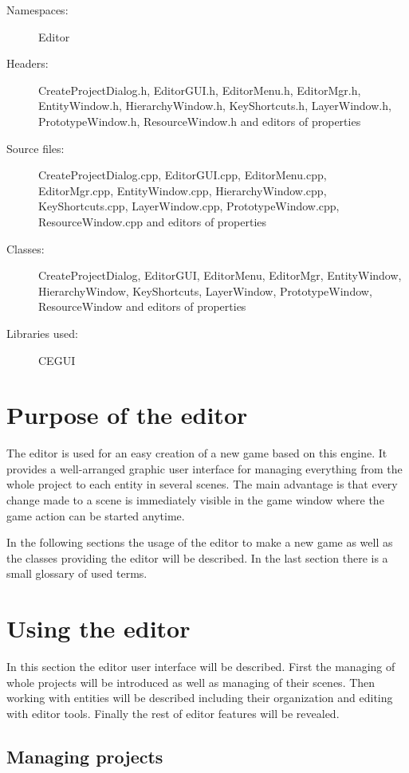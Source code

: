 \begin{description}
  \item[Namespaces:] Editor
  \item[Headers:] CreateProjectDialog.h, EditorGUI.h, EditorMenu.h, EditorMgr\-.h, EntityWindow.h, HierarchyWindow.h, KeyShortcuts.h, LayerWindow.h, PrototypeWindow.h, ResourceWindow\-.h and e\-di\-tors of properties
  \item[Source files:] CreateProjectDialog.cpp, EditorGUI.cpp, EditorMenu.cpp,\\ EditorMgr.cpp, EntityWindow.cpp, HierarchyWindow.cpp, KeyShortcuts.cpp, LayerWindow.cpp, PrototypeWindow\-.cpp, ResourceWindow\-.cpp and editors of properties
  \item[Classes:] CreateProjectDialog, EditorGUI, EditorMenu, EditorMgr, EntityWindow, HierarchyWindow, KeyShortcuts, LayerWindow, PrototypeWindow, ResourceWindow and editors of properties
  \item[Libraries used:] CEGUI
\end{description}

\section{Purpose of the editor}

The editor is used for an easy creation of a new game based on this engine. It provides a well-arranged graphic user interface for managing everything from the whole project to each entity in several scenes. The main advantage is that every change made to a scene is immediately visible in the game window where the game action can be started anytime.

In the following sections the usage of the editor to make a new game as well as the classes providing the editor will be described. In the last section there is a small glossary of used terms.

\section{Using the editor}
\label{sec:editor-using}

In this section the editor user interface will be described. First the managing of whole projects will be introduced as well as managing of their scenes. Then working with entities will be described including their organization and editing with editor tools. Finally the rest of editor features will be revealed.

\subsection{Managing projects}

